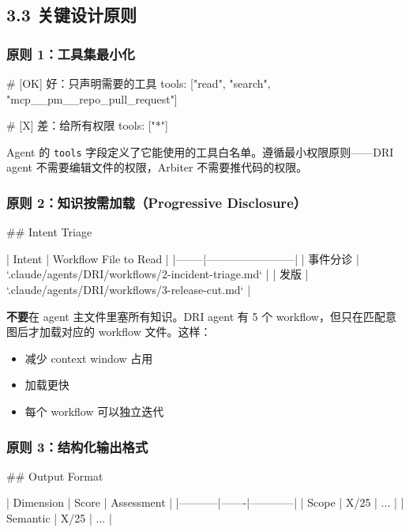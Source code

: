\subsection{3.3 关键设计原则}

\subsubsection{原则 1：工具集最小化}

\begin{codeblock}
# [OK] 好：只声明需要的工具
tools: ["read", "search", "mcp__pm__repo_pull_request"]

# [X] 差：给所有权限
tools: ["*"]
\end{codeblock}

Agent 的 \texttt{tools} 字段定义了它能使用的工具白名单。遵循最小权限原则------DRI agent 不需要编辑文件的权限，Arbiter 不需要推代码的权限。


\subsubsection{原则 2：知识按需加载（Progressive Disclosure）}

\begin{codeblock}
## Intent Triage

| Intent | Workflow File to Read |
|--------|------------------------|
| 事件分诊 | `.claude/agents/DRI/workflows/2-incident-triage.md` |
| 发版    | `.claude/agents/DRI/workflows/3-release-cut.md` |
\end{codeblock}

\textbf{不要}在 agent 主文件里塞所有知识。DRI agent 有 5 个 workflow，但只在匹配意图后才加载对应的 workflow 文件。这样：

\begin{itemize}[leftmargin=2em]
\item 减少 context window 占用
\item 加载更快
\item 每个 workflow 可以独立迭代
\end{itemize}

\subsubsection{原则 3：结构化输出格式}

\begin{codeblock}
## Output Format

| Dimension | Score | Assessment |
|-----------|-------|------------|
| Scope     | X/25  | ...        |
| Semantic  | X/25  | ...        |
\end{codeblock}

